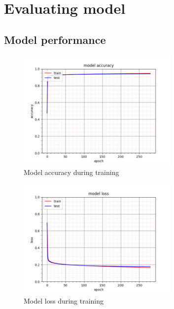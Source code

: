 \section{Evaluating model}

\subsection{Model performance}

\begin{figure}[H]
\center
\includegraphics[width=0.7\textwidth]{pictures/train_acc.png}
\caption{\label{fig:train_acc}Model accuracy during training}
\end{figure}

\begin{figure}[H]
\center
\includegraphics[width=0.7\textwidth]{pictures/train_loss.png}
\caption{\label{fig:train_loss}Model loss during training}
\end{figure}

